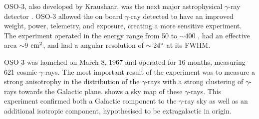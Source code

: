 \Ac{OSO-3}, also developed by Kraushaar, 
was the next major astrophysical $\gamma$-ray detector
\citep{kraushaar_1972_high-energy-cosmic}.  \Ac{OSO-3} 
allowed the on board $\gamma$-ray detected to have an improved weight,
power, telemetry, and exposure, creating a more sensitive experiment.
The experiment operated in the energy range from 50 \mev to $\sim 400$
\mev, had an effective area $\sim 9$ $\text{cm}^2$, and had a angular resolution of
$\sim 24^\circ$ at its \ac{FWHM}.

\Ac{OSO-3} was launched on March 8, 1967 and operated for 16 months, measuring
621 cosmic $\gamma$-rays.  The most important result of the experiment was
to measure a strong anisotrophy in the distribution of the $\gamma$-rays
with a strong clustering of $\gamma$-rays towards the Galactic plane.
 shows a sky map of these $\gamma$-rays.  This
experiment confirmed both a Galactic component to the $\gamma$-ray
sky as well as an additional isotropic component, hypothesised to be
extragalactic in origin.


